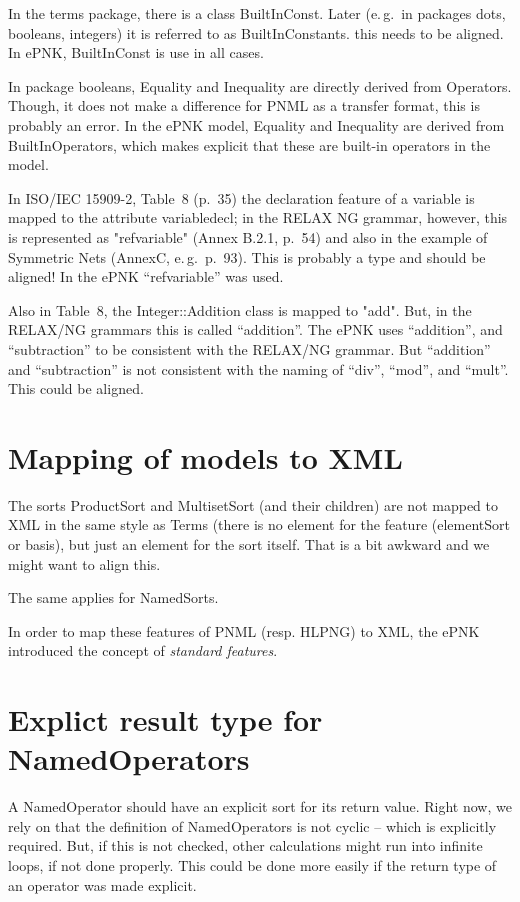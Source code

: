 In the terms package, there is a class BuiltInConst. Later (e.\,g.\ in
packages dots, booleans, integers) it is referred to as BuiltInConstants.
this needs to be aligned. In ePNK, BuiltInConst is use in all cases.
  
In package booleans, Equality and Inequality are directly derived from
Operators. Though, it does not make a difference for PNML as a transfer
format, this is probably an error. In the ePNK model, Equality and Inequality
are derived from BuiltInOperators, which makes explicit that these are
built-in operators in the model.  

In ISO/IEC 15909-2, Table~8 (p.~35) the declaration feature of a variable is
mapped to the attribute variabledecl; in the RELAX NG grammar, however,
this is represented as "refvariable" (Annex B.2.1, p.~54) and also in the
example of Symmetric Nets (AnnexC, e.\,g.\ p.~93). This is probably a type
and should be aligned! In the ePNK ``refvariable'' was used.  
  
Also in Table~8, the Integer::Addition class is mapped to "add". But,
in the RELAX/NG grammars this is called ``addition''. 
The ePNK uses ``addition'', and ``subtraction'' to be consistent with
the RELAX/NG grammar. But ``addition'' and ``subtraction'' is not
consistent with the naming of ``div'', ``mod'', and ``mult''. This could
be aligned.
   
\section{Mapping of models to XML}   

The sorts ProductSort and MultisetSort (and their children) are not
mapped to XML in the same style as Terms (there is no element for
the feature (elementSort or basis), but just an element for the
sort itself. That is a bit awkward and we might want to align this.
  
The same applies for NamedSorts.
  
In order to map these features of PNML (resp. HLPNG) to XML, the
ePNK introduced the concept of \emph{standard features}.  

\section{Explict result type for NamedOperators}
A NamedOperator should have an explicit sort for its return value. Right
now, we rely on that the definition of NamedOperators is not cyclic --
which is explicitly required. But, if this is not checked,
other calculations might run into infinite loops, if not done
properly. This could be done more easily if the return type
of an operator was made explicit.
   
